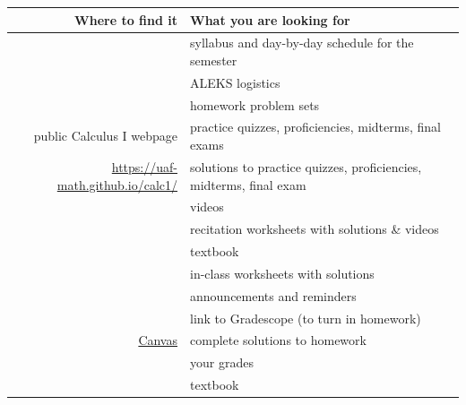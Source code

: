 \documentclass[12pt]{article}
\begin{document}
\begin{table}[h]
\centering
\begin{tabular}{rl}
Where to find it&What you are looking for\\
\hline \hline
&syllabus and day-by-day schedule for the semester\\
&ALEKS logistics\\
&homework problem sets\\
public Calculus I webpage&practice quizzes, proficiencies, midterms, final exams\\
\href{https://uaf-math.github.io/calc1/}{https://uaf-math.github.io/calc1/}&solutions to practice quizzes, proficiencies, midterms, final exam\\
&videos\\
&recitation worksheets with solutions \& videos\\
&textbook\\
&in-class worksheets with solutions\\
\hline
&announcements and reminders\\
&link to Gradescope (to turn in homework)\\
\href{https://www.uaf.edu/uaf/current/canvas.php}{Canvas}& complete solutions to homework\\
& your grades\\
&textbook\\
\end{tabular}
\end{table}
\end{document}
